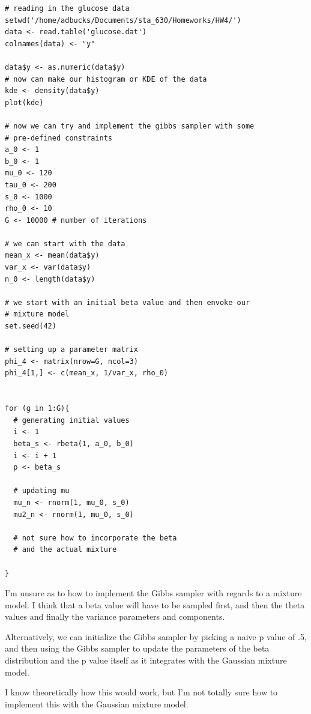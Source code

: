 \documentclass[12pt, letterpaper]{article}
\begin{document}
\begin{verbatim}
# reading in the glucose data 
setwd('/home/adbucks/Documents/sta_630/Homeworks/HW4/')
data <- read.table('glucose.dat')
colnames(data) <- "y"

data$y <- as.numeric(data$y)
# now can make our histogram or KDE of the data 
kde <- density(data$y)
plot(kde)

# now we can try and implement the gibbs sampler with some 
# pre-defined constraints 
a_0 <- 1
b_0 <- 1
mu_0 <- 120
tau_0 <- 200
s_0 <- 1000
rho_0 <- 10
G <- 10000 # number of iterations 

# we can start with the data 
mean_x <- mean(data$y)
var_x <- var(data$y)
n_0 <- length(data$y)

# we start with an initial beta value and then envoke our 
# mixture model 
set.seed(42)

# setting up a parameter matrix 
phi_4 <- matrix(nrow=G, ncol=3)
phi_4[1,] <- c(mean_x, 1/var_x, rho_0)


for (g in 1:G){
  # generating initial values 
  i <- 1 
  beta_s <- rbeta(1, a_0, b_0)
  i <- i + 1
  p <- beta_s
  
  # updating mu 
  mu_n <- rnorm(1, mu_0, s_0)
  mu2_n <- rnorm(1, mu_0, s_0)
  
  # not sure how to incorporate the beta 
  # and the actual mixture 
  
}
\end{verbatim}

I'm unsure as to how to implement the Gibbs sampler with regards to a mixture model. I think that a beta value will have to be sampled first, and then the theta values and finally the variance parameters and components. 

Alternatively, we can initialize the Gibbs sampler by picking a naive p value of .5, and then using the Gibbs sampler to update the parameters of the beta distribution and the p value itself as it integrates with the Gaussian mixture model. 

I know theoretically how this would work, but I'm not totally sure how to implement this with the Gaussian mixture model. 
\end{document}
